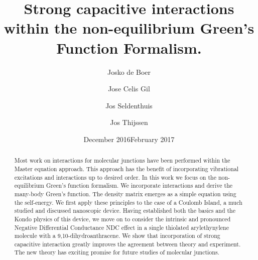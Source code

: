 \documentclass{article}
\title{Strong capacitive interactions within the non-equilibrium Green's Function Formalism.}
\author{Josko de Boer \and Jose Celis Gil \and Jos Seldenthuis \and Jos Thijssen}
\date{December 2016}
\date{February 2017}
\begin{document}
\maketitle
\begin{abstract}
    Most work on interactions for molecular junctions have been performed within the Master equation approach. This approach has the benefit of incorporating vibrational excitations and interactions up to desired order. In this work we focus on the non-equilibrium Green's function formalism. We incorporate interactions and derive the many-body Green's function. The density matrix emerges as a simple equation using the self-energy. We first apply these principles to the case of a Coulomb Island, a much studied and discussed nanoscopic device.  Having established both the basics and the Kondo physics of this device, we move on to consider the intrinsic and pronounced Negative Differential Conductance NDC effect in a single thiolated arylethynylene molecule with a 9,10-dihydroanthracene. We show that incorporation of strong capacitive interaction greatly improves the agreement between theory and experiment. The new theory has exciting promise for future studies of molecular junctions.
\end{abstract}
\end{document}

